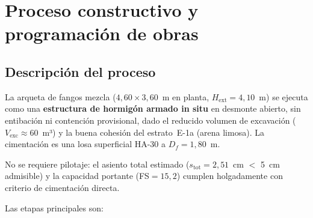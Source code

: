 \section{Proceso constructivo y programación de obras}
\label{sec:arqueta_proceso}

\subsection{Descripción del proceso}

La arqueta de fangos mezcla ($4{,}60 \times 3{,}60$~m en planta,
$H_\text{ext}=4{,}10$~m) se ejecuta como una
\textbf{estructura de hormigón armado in situ} en desmonte abierto,
sin entibación ni contención provisional, dado el reducido volumen de
excavación ($V_\text{exc}\approx 60$~m³) y la buena cohesión del
estrato~E-1a (arena limosa).
La cimentación es una losa superficial HA-30 a $D_f = 1{,}80$~m.

No se requiere pilotaje: el asiento total estimado
($s_\text{tot}=2{,}51$~cm $<$ 5~cm admisible) y la capacidad portante
(FS$=15{,}2$) cumplen holgadamente con criterio de cimentación directa.

Las etapas principales son:

